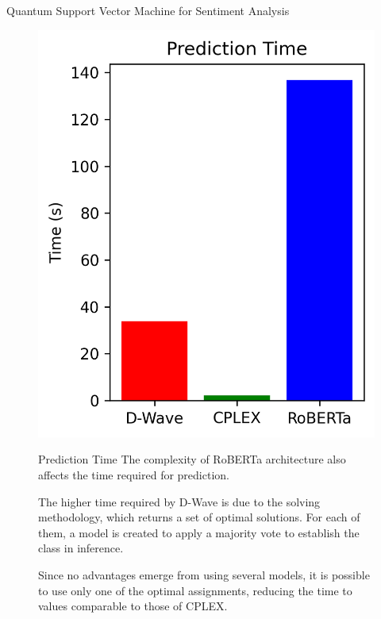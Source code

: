 \documentclass[final]{beamer}
\newlength{\colwidth}
\begin{document}
\begin{frame}[t,fragile]
\begin{columns}[t]
\begin{column}{\colwidth}
\begin{block}{Quantum Support Vector Machine for Sentiment Analysis}
    \begin{figure}[h!]
      \centering
      \begin{minipage}{0.3\textwidth}
          \centering
          \includegraphics[height=0.15\textheight]{logos/prediction.png}
      \end{minipage}%
      \hfill
      \begin{minipage}{0.65\textwidth}
        \begin{alertblock}{Prediction Time}
          The complexity of RoBERTa architecture also affects the time required for prediction.

          The higher time required by D-Wave is due to the solving methodology, which returns a set of optimal solutions. 
          For each of them, a model is created to apply a majority vote to establish the class in inference. 

          Since no advantages emerge from using several models, it is possible to use only one of the optimal assignments, reducing the time to values comparable to those of CPLEX.
        \end{alertblock}
      \end{minipage}
    \end{figure}
  \end{block}


\end{column}
\end{columns}
\end{frame}
\end{document}
